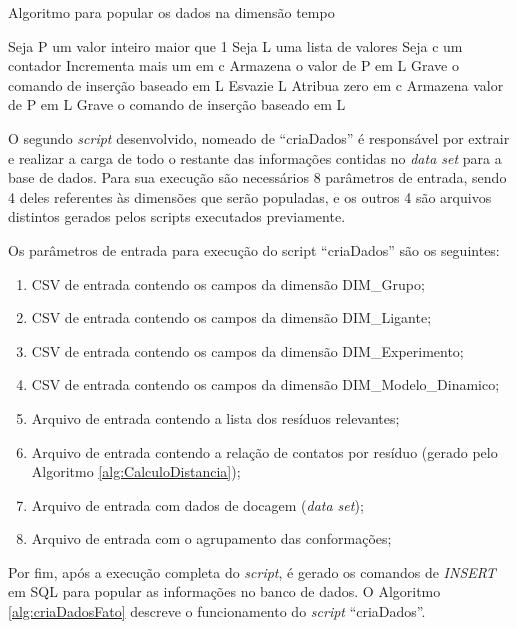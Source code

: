 \begin{algorithm}[H]
\caption{Algoritmo para popular os dados na dimensão tempo}
\label{alg:criaDadosDIMTempo}
{\fontsize{10}{10}\selectfont
\begin{algorithmic}[1]
	\STATE Seja P um valor inteiro maior que 1
	\STATE Seja L uma lista de valores
	\STATE Seja c um contador
		\STATE Incrementa mais um em c
			\STATE Armazena o valor de P em L
			\STATE Grave o comando de inserção baseado em L
			\STATE Esvazie L
			\STATE Atribua zero em c
		\ELSE
			\STATE Armazena valor de P em L
		\ENDIF
	\ENDFOR
		\STATE Grave o comando de inserção baseado em L
	\ENDIF
\end{algorithmic}
}
\end{algorithm}

O segundo \emph{script} desenvolvido, nomeado de ``criaDados'' é responsável por extrair e realizar a carga de todo o restante das informações contidas no \emph{data set} para a base de dados. Para sua execução são necessários 8 parâmetros de entrada, sendo 4 deles referentes às dimensões que serão populadas, e os outros 4 são arquivos distintos gerados pelos scripts executados previamente.

Os parâmetros de entrada para execução do script ``criaDados'' são os seguintes:
\begin{enumerate}
	\item CSV de entrada contendo os campos da dimensão DIM\_Grupo;
	\item CSV de entrada contendo os campos da dimensão DIM\_Ligante;
	\item CSV de entrada contendo os campos da dimensão DIM\_Experimento;
	\item CSV de entrada contendo os campos da dimensão DIM\_Modelo\_Dinamico;
	\item Arquivo de entrada contendo a lista dos resíduos relevantes;
	\item Arquivo de entrada contendo a relação de contatos por resíduo (gerado pelo Algoritmo \ref{alg:CalculoDistancia});
	\item Arquivo de entrada com dados de docagem (\emph{data set});
	\item Arquivo de entrada com o agrupamento das conformações;
\end{enumerate}

Por fim, após a execução completa do \emph{script}, é gerado os comandos de \emph{INSERT} em SQL para popular as informações no banco de dados. O Algoritmo \ref{alg:criaDadosFato} descreve o funcionamento do \emph{script} ``criaDados''.

